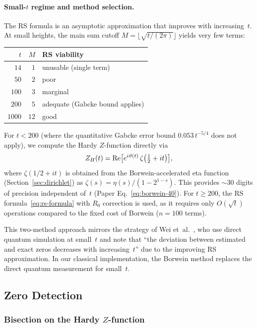 \paragraph{Small-$t$ regime and method selection.}
The RS formula is an asymptotic approximation that improves with increasing~$t$.
At small heights, the main sum cutoff $M = \lfloor\sqrt{t/(2\pi)}\rfloor$ yields
very few terms:
\begin{center}
\begin{tabular}{@{}rrl@{}}
\toprule
$t$ & $M$ & RS viability \\
\midrule
$14$ & $1$ & unusable (single term) \\
$50$ & $2$ & poor \\
$100$ & $3$ & marginal \\
$200$ & $5$ & adequate (Gabcke bound applies) \\
$1000$ & $12$ & good \\
\bottomrule
\end{tabular}
\end{center}
For $t < 200$ (where the quantitative Gabcke error bound $0.053\,t^{-5/4}$ does not
apply), we compute the Hardy $Z$-function directly via
\begin{equation}\label{eq:zh-direct}
  Z_H(t) = \operatorname{Re}\bigl[e^{i\vartheta(t)}\,\zeta\bigl(\tfrac{1}{2}+it\bigr)\bigr],
\end{equation}
where $\zeta(1/2+it)$ is obtained from the Borwein-accelerated eta function
(Section~\ref{sec:dirichlet}) as $\zeta(s) = \eta(s)/(1-2^{1-s})$. This provides
${\sim}30$ digits of precision independent of~$t$ (Paper Eq.~\ref{eq:borwein-40}).
For $t \ge 200$, the RS formula~\eqref{eq:rs-formula} with $R_0$ correction is used,
as it requires only $O(\sqrt{t})$ operations compared to the fixed cost of Borwein
($n = 100$ terms).

This two-method approach mirrors the strategy of Wei et~al.~\cite{wei2025}, who use
direct quantum simulation at small~$t$ and note that ``the deviation between estimated
and exact zeros decreases with increasing~$t$'' due to the improving RS approximation.
In our classical implementation, the Borwein method replaces the direct quantum
measurement for small~$t$.


\subsection{Zero Detection}
\label{sec:zero-detection}

\subsubsection{Bisection on the Hardy $Z$-function}
\label{sec:bisection}

